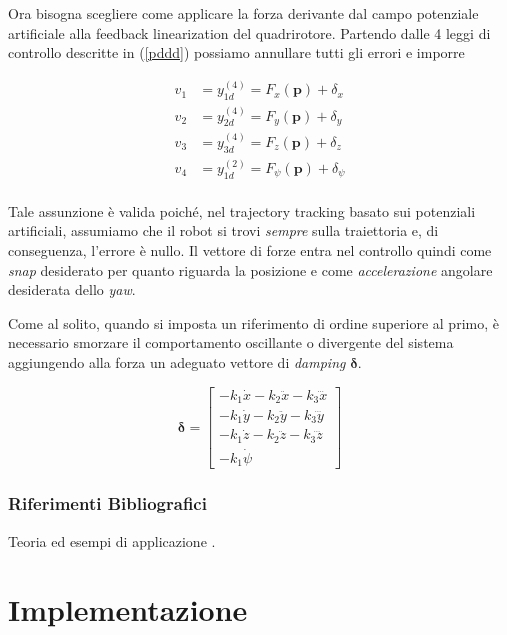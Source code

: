 \documentclass[a4paper,10pt]{article}
\begin{document}
Ora bisogna scegliere come applicare la forza derivante dal campo potenziale artificiale alla feedback linearization del quadrirotore. Partendo dalle 4 leggi di controllo descritte in (\ref{pddd}) possiamo annullare tutti gli errori e imporre

\begin{equation}\begin{split}\label{pot-pddd}
v_1 &= y_{1d}^{(4)} = F_x(\mathbf{p}) + \delta_x \\
v_2 &= y_{2d}^{(4)} = F_y(\mathbf{p}) + \delta_y \\
v_3 &= y_{3d}^{(4)} = F_z(\mathbf{p}) + \delta_z \\
v_4 &= y_{1d}^{(2)} = F_{\psi}(\mathbf{p}) + \delta_{\psi} \\
\end{split}
\end{equation}

Tale assunzione è valida poiché, nel trajectory tracking basato sui potenziali artificiali, assumiamo che il robot si trovi \emph{sempre} sulla traiettoria e, di conseguenza, l'errore è nullo. Il vettore di forze entra nel controllo quindi come \emph{snap} desiderato per quanto riguarda la posizione e come \emph{accelerazione} angolare desiderata dello \emph{yaw}.

Come al solito, quando si imposta un riferimento di ordine superiore al primo, è necessario smorzare il comportamento oscillante o divergente del sistema aggiungendo alla forza un adeguato vettore di \emph{damping} $\mathbf{\delta}$.

\begin{equation}
\mathbf{\delta} = \left[ \begin{matrix}
- k_1 \dot{x} - k_2 \ddot{x} - k_3 \dddot{x} \\ 
- k_1 \dot{y} - k_2 \ddot{y} - k_3 \dddot{y} \\ 
- k_1 \dot{z} - k_2 \ddot{z} - k_3 \dddot{z} \\ 
- k_1 \dot{\psi}
\end{matrix} \right]
\label{eq:damping}
\end{equation}

\subsubsection*{Riferimenti Bibliografici}

Teoria \cite{RoboticsMPC} ed esempi di applicazione \cite{Park2001}.
\newpage

\section{Implementazione}
\end{document}
